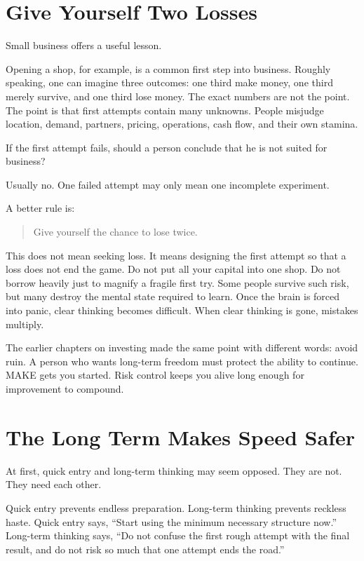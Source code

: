 \section*{Give Yourself Two Losses}

Small business offers a useful lesson.

Opening a shop, for example, is a common first step into business. Roughly speaking, one can imagine three outcomes: one third make money, one third merely survive, and one third lose money. The exact numbers are not the point. The point is that first attempts contain many unknowns. People misjudge location, demand, partners, pricing, operations, cash flow, and their own stamina.

If the first attempt fails, should a person conclude that he is not suited for business?

Usually no. One failed attempt may only mean one incomplete experiment.

A better rule is:

\begin{quote}
Give yourself the chance to lose twice.
\end{quote}

This does not mean seeking loss. It means designing the first attempt so that a loss does not end the game. Do not put all your capital into one shop. Do not borrow heavily just to magnify a fragile first try. Some people survive such risk, but many destroy the mental state required to learn. Once the brain is forced into panic, clear thinking becomes difficult. When clear thinking is gone, mistakes multiply.

The earlier chapters on investing made the same point with different words: avoid ruin. A person who wants long-term freedom must protect the ability to continue. MAKE gets you started. Risk control keeps you alive long enough for improvement to compound.

\section*{The Long Term Makes Speed Safer}

At first, quick entry and long-term thinking may seem opposed. They are not. They need each other.

Quick entry prevents endless preparation. Long-term thinking prevents reckless haste. Quick entry says, ``Start using the minimum necessary structure now.'' Long-term thinking says, ``Do not confuse the first rough attempt with the final result, and do not risk so much that one attempt ends the road.''

